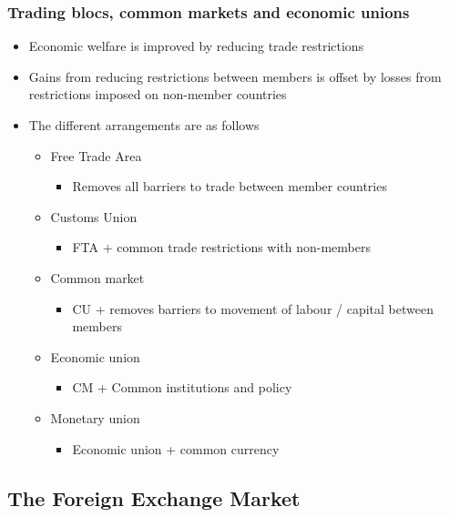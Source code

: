 \documentclass[../notes_compiled.tex]{subfiles}
\begin{document}
\subsubsection{Trading blocs, common markets and economic unions}
\begin{itemize}
\item Economic welfare is improved by reducing trade restrictions
\item Gains from reducing restrictions between members is offset by losses from restrictions imposed on non-member countries
\item The different arrangements are as follows
\begin{itemize}
\item Free Trade Area
\begin{itemize}
\item Removes all barriers to trade between member countries
\end{itemize}
\item Customs Union
\begin{itemize}
\item FTA + common trade restrictions with non-members
\end{itemize}
\item Common market
\begin{itemize}
\item CU + removes barriers to movement of labour / capital between members
\end{itemize}
\item Economic union
\begin{itemize}
\item CM + Common institutions and policy
\end{itemize}
\item Monetary union
\begin{itemize}
\item Economic union + common currency
\end{itemize}
\end{itemize}
\end{itemize}

\subsection{The Foreign Exchange Market}
\end{document}
